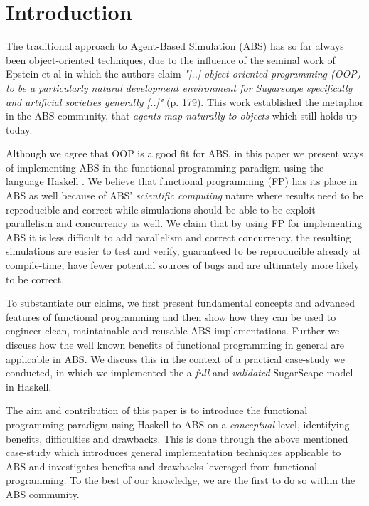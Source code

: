 \section{Introduction}
The traditional approach to Agent-Based Simulation (ABS) has so far always been object-oriented techniques, due to the influence of the seminal work of Epstein et al \cite{epstein_growing_1996} in which the authors claim \textit{"[..] object-oriented programming (OOP) to be a particularly natural development environment for Sugarscape specifically and artificial societies generally [..]"} (p. 179). This work established the metaphor in the ABS community, that \textit{agents map naturally to objects} \cite{north_managing_2007} which still holds up today. 

Although we agree that OOP is a good fit for ABS, in this paper we present ways of implementing ABS in the functional programming  paradigm using the language Haskell \cite{hudak_history_2007}. We believe that functional programming (FP) has its place in ABS as well because of ABS' \textit{scientific computing} nature where results need to be reproducible and correct while simulations should be able to be exploit parallelism and concurrency as well. 
We claim that by using FP for implementing ABS it is less difficult to add parallelism and correct concurrency, the resulting simulations are easier to test and verify, guaranteed to be reproducible already at compile-time, have fewer potential sources of bugs and are ultimately more likely to be correct. 

To substantiate our claims, we first present fundamental concepts and advanced features of functional programming and then show how they can be used to engineer clean, maintainable and reusable ABS implementations. Further we discuss how the well known benefits of functional programming in general are applicable in ABS. We discuss this in the context of a practical case-study we conducted, in which we implemented the a \textit{full} and \textit{validated} SugarScape model \cite{epstein_growing_1996} in Haskell. 

The aim and contribution of this paper is to introduce the functional programming paradigm using Haskell to ABS on a \textit{conceptual} level, identifying benefits, difficulties and drawbacks. This is done through the above mentioned case-study which introduces general implementation techniques applicable to ABS and investigates benefits and drawbacks leveraged from functional programming. To the best of our knowledge, we are the first to do so within the ABS community.

